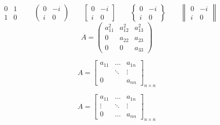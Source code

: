 \documentclass{ctexart}
\begin{document}
	
	\[
		\begin{matrix}
			0&1\\
			1&0
		\end{matrix}\qquad
	\begin{pmatrix}
		0&-i\\
		i&0 
	\end{pmatrix} \qquad
\begin{bmatrix}
	0&-i\\
	i&0 
\end{bmatrix} \qquad
\begin{Bmatrix}
	0&-i\\
	i&0 
\end{Bmatrix} \qquad
\begin{Vmatrix}
	0&-i\\
	i&0 
\end{Vmatrix} \qquad
\]
\[
A=\begin{pmatrix}
	a_{11}^2&a_{12}^2&a_{13}^2\\
	0&a_{22}&a_{23}\\
	0&0&a_{33}
\end{pmatrix}
\]

\[
	A=\begin{bmatrix}
		a_{11}&\dots&a_{1n} \\
		&\ddots & \vdots \\ 
		0& & a_{nn}
	\end{bmatrix}_{n \times n}
\]

\[
A=\begin{bmatrix}
	a_{11}&\dots&a_{1n} \\
	\vdots &\ddots & \vdots \\ 
	0& \dots & a_{nn}
\end{bmatrix}_{n \times n}
\]
\end{document}
